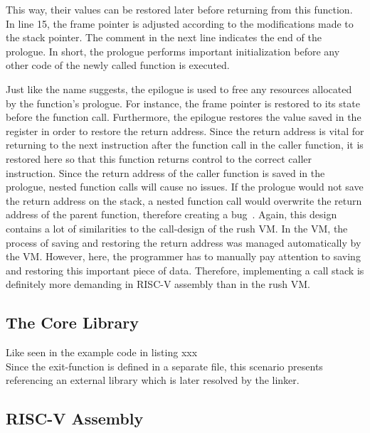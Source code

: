 This way, their values can be restored later before returning from this function.
In line 15, the frame pointer is adjusted according to the modifications made to the stack pointer.
The comment in the next line indicates the end of the prologue.
In short, the prologue performs important initialization before any other code of the newly called function is executed.

Just like the name suggests, the epilogue is used to free any resources allocated by the function's prologue.
For instance, the frame pointer is restored to its state before the function call.
Furthermore, the epilogue restores the value saved in the  register in order to restore the return address.
Since the return address is vital for returning to the next instruction after the function call in the caller function, it is restored here so that this function returns control to the correct caller instruction.
Since the return address of the caller function is saved in the prologue, nested function calls will cause no issues.
If the prologue would not save the return address on the stack, a nested function call would overwrite the return address of the parent function, therefore creating a bug~\cite[p.33]{Patterson2017}.
Again, this design contains a lot of similarities to the call-design of the rush VM\@.
In the VM, the process of saving and restoring the return address was managed automatically by the VM\@.
However, here, the programmer has to manually pay attention to saving and restoring this important piece of data.
Therefore, implementing a call stack is definitely more demanding in RISC-V assembly than in the rush VM\@.

\subsection{The Core Library}

Like seen in the example code in listing xxx\\
Since the exit-function is defined in a separate file, this scenario presents referencing an external library which is later resolved by the linker.

\subsection{RISC-V Assembly}

